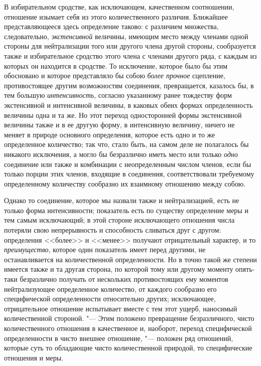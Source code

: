В избирательном сродстве, как исключающем, качественном соотношении,
отношение изымает себя из этого количественного различия. Ближайшее
представляющееся здесь определение таково: с различием множества,
следовательно, {\em экстенсивной} величины, имеющим
место между членами одной стороны для нейтрализации того или другого члена
другой стороны, сообразуется также и избирательное сродство этого члена с
членами другого ряда, с каждым из которых он находится в сродстве. То
исключение, которое было бы этим обосновано и которое представляло бы собою
{\em более прочное} сцепление, противостоящее другим
возможностям соединения, превращается, казалось бы, в тем большую
{\em интенсивность}, согласно указанному ранее
тождеству форм экстенсивной и интенсивной величины, в каковых обеих формах
определенность величины одна и та же. Но этот переход односторонней формы
экстенсивной величины также и в ее другую форму, в интенсивную величину,
ничего не меняет в природе основного определения, которое есть одно и то же
определенное количество; так что, стало быть, на самом деле не полагалось
бы никакого исключения, а могло бы безразлично иметь место или только
{\em одно} соединение или также и комбинации с
неопределенным числом членов, если бы только порции этих членов, входящие в
соединения, соответствовали требуемому определенному количеству сообразно
их взаимному отношению между собою.

Однако то соединение, которое мы назвали также и нейтрализацией, есть не
только форма интенсивности; показатель есть по существу определение меры и
тем самым исключающий; в этой стороне исключающего отношения числа потеряли
свою непрерывность и способность сливаться друг с другом: определения
<<более>> и <<менее>> получают отрицательный характер, и то
{\em преимущество}, которое один показатель имеет перед
другими, не останавливается на количественной определенности. Но в точно
такой же степени имеется также и та другая сторона, по которой тому или
другому моменту опять-таки безразлично получать от нескольких
противостоящих ему моментов нейтрализующее определенное количество, от
каждого сообразно его специфической определенности относительно других;
исключающее, отрицательное отношение испытывает вместе с тем этот ущерб,
наносимый количественной стороной. "--- Этим положено превращение
безразличного, чисто количественного отношения в качественное и, наоборот,
переход специфической определенности в чисто внешнее отношение, "--- положен
ряд отношений, которые суть то обладающие чисто количественной природой, то
специфические отношения и меры.

